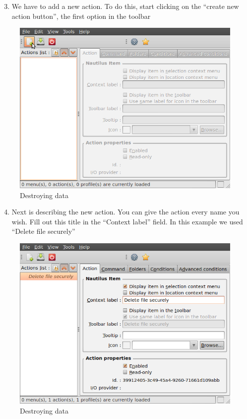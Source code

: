\begin{enumerate}[1.]
\setcounter{enumi}{2}
\item
  We have to add a new action. To do this, start clicking on the
  ``create new action button'', the first option in the toolbar
\end{enumerate}
\begin{figure}[htbp]
\centering
\includegraphics{destroy_data_010.png}
\caption{Destroying data}
\end{figure}

\begin{enumerate}[1.]
\setcounter{enumi}{3}
\item
  Next is describing the new action. You can give the action every name
  you wish. Fill out this title in the ``Context label'' field. In this
  example we used ``Delete file securely''
\end{enumerate}
\begin{figure}[htbp]
\centering
\includegraphics{destroy_data_011.png}
\caption{Destroying data}
\end{figure}


